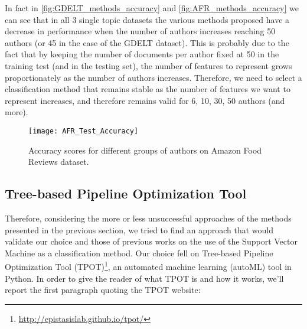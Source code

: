 In fact in \autoref{fig:GDELT_methods_accuracy} and \autoref{fig:AFR_methods_accuracy} we can see that in all 3 single topic datasets the various methods proposed have a decrease in performance when the number of authors increases reaching 50 authors (or 45 in the case of the GDELT dataset).
This is probably due to the fact that by keeping the number of documents per author fixed at 50 in the training test (and in the testing set), the number of features to represent grows proportionately as the number of authors increases. Therefore, we need to select a classification method that remains stable as the number of features we want to represent increases, and therefore remains valid for 6, 10, 30, 50 authors (and more).


\begin{figure}[ht]
	\centering
	\texttt{[image: AFR\_Test\_Accuracy]}
	\caption[Methods performance on Amazon Food Reviews dataset]{Accuracy scores for different groups of authors on Amazon Food Reviews dataset.}
	\label{fig:AFR_methods_accuracy}
\end{figure}

\subsection{Tree-based Pipeline Optimization Tool}
Therefore, considering the more or less unsuccessful approaches of the methods presented in the previous section, we tried to find an approach that would validate our choice and those of previous works on the use of the Support Vector Machine as a classification method.
Our choice fell on Tree-based Pipeline Optimization Tool (TPOT)\footnote{\url{http://epistasislab.github.io/tpot/}}, an automated machine learning (autoML) tool in Python.
In order to give the reader of what TPOT is and how it works, we'll report the first paragraph quoting the TPOT website:

